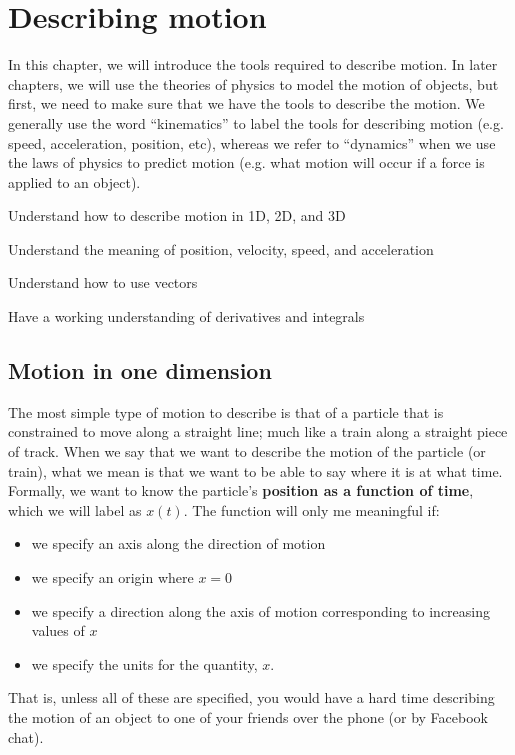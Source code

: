 %
\chapter{Describing motion}
\label{chap:3_Kinematics}
In this chapter, we will introduce the tools required to describe motion. In later chapters, we will use the theories of physics to model the motion of objects, but first, we need to make sure that we have the tools to describe the motion. We generally use the word ``kinematics'' to label the tools for describing motion (e.g. speed, acceleration, position, etc), whereas we refer to ``dynamics'' when we use the laws of physics to predict motion (e.g. what motion will occur if a force is applied to an object). 
 \vspace{1cm}
\begin{learningObjectives}
\item Understand how to describe motion in 1D, 2D, and 3D
\item Understand the meaning of position, velocity, speed, and acceleration
\item Understand how to use vectors
\item Have a working understanding of derivatives and integrals
\end{learningObjectives}

\section{Motion in one dimension}
The most simple type of motion to describe is that of a particle that is constrained to move along a straight line; much like a train along a straight piece of track. When we say that we want to describe the motion of the particle (or train), what we mean is that we want to be able to say where it is at what time. Formally, we want to know the particle's \textbf{position as a function of time}, which we will label as $x(t)$. The function will only me meaningful if:
\begin{itemize}
\item we specify an axis along the direction of motion
\item we specify an origin where $x=0$
\item we specify a direction along the axis of motion corresponding to increasing values of $x$
\item we specify the units for the quantity, $x$.
\end{itemize}
That is, unless all of these are specified, you would have a hard time describing the motion of an object to one of your friends over the phone (or by Facebook chat). 

